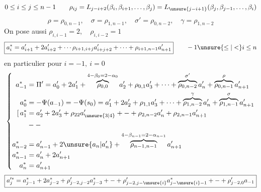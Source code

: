 \[
0\leq i\leq j\leq n-1\qquad
\rho_{ij}=L_{j-i+2}(\beta_i,\beta_{i+1},\ldots,\beta_j)
=L_{\unsure{j-i+1}}(\beta_j,\beta_{j-1},\ldots,\beta_i)
\]
\[
\rho=\rho_{0,n-1},\quad \sigma=\rho_{1,n-1},\quad
\sigma'=\rho_{0,n-2},\quad \gamma=\rho_{1,n-2}
\]
On pose aussi \(\rho_{i,i-1}=2,\quad\rho_{i,i-2}=1\)
\[
\boxed{a_i^*=a'_{i+1}+2a'_{i+2}
+\cdots\rho_{i+1,i+j}a'_{i+j+2}+\cdots+\rho_{i+1,n-1}a'_{n+1}}
\qquad -1\unsure{\leq|<}i\leq n
\]
en particulier pour \(i=-1,\ i=0\)
\[
\left\{\begin{aligned}
a_{-1}^*&=\Pi'=a'_0+2a'_1+
\overbrace{\rho_{0,0}}^{4-\beta_0=2-\alpha_0}a'_2+
\rho_{0,1}a'_3+\cdots+
\overbrace{\rho_{0,n-2}}^{\sigma'}a'_n+
\overbrace{\rho_{0,n-1}}^\rho a'_{n+1}\\
a_0^*&=-\Psi(a_{-1})=-\Psi(s_0)
=a'_1+2a'_2+\rho_{1,1}a'_3+\cdots+
\overbrace{\rho_{1,n-2}}^\gamma a'_n+
\overbrace{\rho_{1,n-1}}^\sigma a'_{n+1}\\
[\,a_1^*&=a'_2+2a'_3+\rho_{22}a'_{\unsure{3|4}}+\mathbin{-}
+\rho_{2,n-2}a'_n+\rho_{2,n-1}a'_{n+1}\\
&\mathbin{-}\mathbin{-}\\
a_{n-2}^*&=a'_{n-1}+2\unsure{a_n|a'_n}+
\overbrace{\rho_{n-1,n-1}}^{4-\beta_{n-1}=2-\alpha_{n-1}}a'_{n+1}\\
a_{n-1}^*&=a'_n+2a'_{n+1}\\
a_n^*&=a'_{n+1}
\end{aligned}\right.
\]
\[
\boxed{
a_j'^*=a_{j-1}^*+2a_{j-2}^*
+\rho'_{j-2,j-2}a_{j-3}^*+\mathbin{-}
+\rho'_{j-2,j-\unsure{i}}a_{j-\unsure{i}-1}^*
+\mathbin{-}+\rho'_{j-2,0}a_{-1}}
\]
